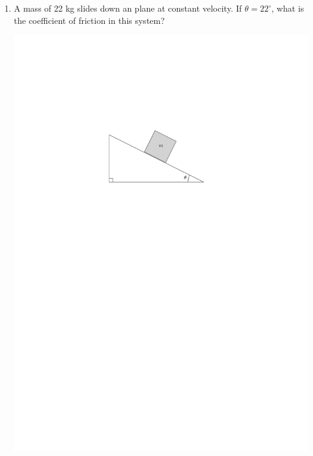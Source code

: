 \documentclass[12pt]{report}
\begin{document}
\begin{enumerate}
\vspace{4cm}


\item A mass of 22 kg slides down an plane at constant velocity.  If $\theta = 22^\circ$, what is the coefficient of friction in this system?

\vspace{1cm}

\includegraphics{inclinedPlane}

\pagebreak


\end{enumerate}
\end{document}
